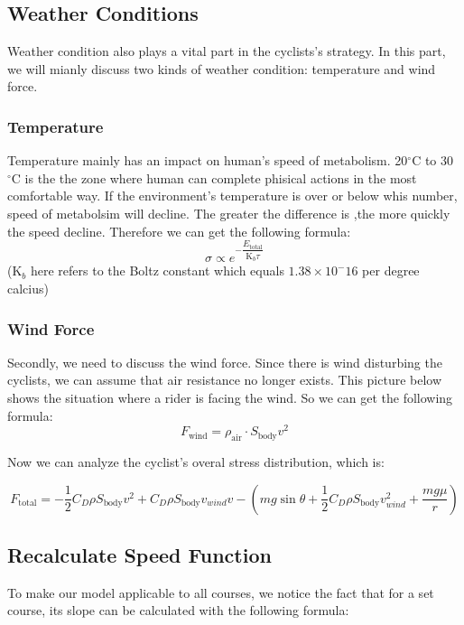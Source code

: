 \documentclass{article}
\begin{document}


		\subsection{Weather Conditions}
			Weather condition also plays a vital part in the cyclists's strategy. In this part, we will mianly discuss two kinds of weather condition: temperature and wind force.
		\subsubsection{Temperature}
			Temperature mainly has an impact on human's speed of metabolism. 20$^\circ \mathrm{C}$ to 30$^\circ\mathrm{C}$ is the the zone where human can complete phisical actions in the most comfortable way. If the environment's temperature is over or below whis number, speed of metabolsim will decline. The greater the difference is ,the more quickly the speed decline. Therefore we can get the following formula:
			$$\sigma\propto e^{-\dfrac{ E _\mathrm{total}}{\mathrm{K}_ b \tau}}$$
			($\mathrm{K}_ b $ here refers to the Boltz constant which equals $1.38\times10^-16$ per degree calcius)
		\subsubsection{Wind Force}
			Secondly, we need to discuss the wind force. Since there is wind disturbing the cyclists, we can assume that air resistance no longer exists. This picture below shows the situation where a rider is facing the wind. So we can get the following formula:
			$$F_\mathrm{wind}=\rho_\mathrm{air}\cdot S_\mathrm{body}v^2$$

			Now we can analyze the cyclist's overal stress distribution, which is:

			\[F_\mathrm{total}=-\frac{1}{2}C_ D \rho S_\mathrm{body} v^2+C_ D \rho S_\mathrm{body}v_{wind}v-(mg\sin\theta+\frac{1}{2}C_ D \rho S_\mathrm{body}v_{wind}^2+\frac{mg\mu}{r})\]



		\subsection{Recalculate Speed Function}

			To make our model applicable to all courses, we notice the fact that for a set course, its slope can be calculated with the following formula:
\end{document}

